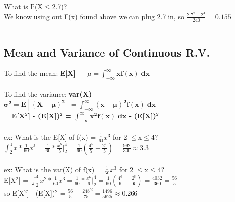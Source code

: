 \documentclass[12pt, a4paper]{article}
\begin{document}
	\noindent What is P(X$\leq$2.7)? \\
	We know using out F(x) found above we can plug 2.7 in, so $\frac{2.7^2-2^4}{240} = 0.155$ \\~\\
	
	\subsection{Mean and Variance of Continuous R.V.}
	To find the mean: \textbf{E[X] = $\mu = \mathbf{\int_{-\infty}^{\infty}xf(x)\;dx}$} \\~\\
	To find the variance: \textbf{var(X) = $\mathbf{\sigma^2 = E[(X-\mu)^2] = \int_{-\infty}^{\infty}(x-\mu)^2f(x)\;dx}$} \\
	\hspace*{64mm} = \textbf{E[X$^2$] - (E[X])$^2$ = $\mathbf{\int_{-\infty}^{\infty}x^2f(x)\;dx}$ - (E[X])$^2$} \\~\\
	ex: What is the E[X] of f(x) = $\frac{1}{60}x^3$ for 2 $\leq$x$\leq$4? \\
	$\int_{2}^{4}x*\frac{1}{60}x^3 = \frac{1}{60}*\frac{x^5}{5}\bigr|_2^4 = \frac{1}{60}(\frac{4^5}{5}-\frac{2^5}{5}) = \frac{992}{300} \approx 3.3$ \\~\\
	ex: What is the var(X) of f(x) = $\frac{1}{60}x^3$ for 2 $\leq$x$\leq$4? \\
	E[X$^2$] = $\int_{2}^{4}x^2*\frac{1}{60}x^3 = \frac{1}{60}*\frac{x^6}{6}\bigr|_2^4 = \frac{1}{60}(\frac{4^6}{6}-\frac{2^6}{6}) = \frac{4032}{360} = \frac{56}{5}$ \\ so E[X$^2$] - (E[X])$^2$ = $\frac{56}{5} - \frac{248}{75}^2 = \frac{1496}{5625} \approx 0.266$ \\~\\
	
\end{document}
